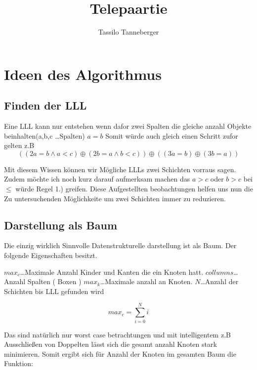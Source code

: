 \documentclass{article}
\begin{document}
\title{Telepaartie}
\author{Tassilo Tanneberger}

\maketitle

\section{Ideen des Algorithmus}

\subsection*{ Finden der LLL}

Eine LLL kann nur entstehen wenn dafor zwei Spalten die gleiche anzahl Objekte beinhalten(a,b,c \dots Spalten) \( a = b\) Somit würde auch gleich einen Schritt zufor gelten z.B 
\begin{equation}
	((2a = b \wedge a < c)  \oplus (2b = a \wedge b < c)) \oplus ((3a = b)  \oplus (3b = a))
\end{equation}

Mit diesem Wissen können wir Mögliche LLLs zwei Schichten vorraus sagen. Zudem möchte ich noch kurz darauf aufmerksam machen das \(a>c\) oder \(b > c\) bei  \( \leq \) würde Regel 1.) greifen. Diese Aufgestellten beobachtungen helfen uns nun die Zu untersuchenden Möglichkeite um zwei Schichten immer zu reduzieren.

\subsection*{ Darstellung als Baum}

Die einzig wirklich Sinnvolle Datenstrukturelle darstellung ist als Baum. Der folgende Eigenschaften besitzt.
\newline

\(max_c\)\dots 				Maximale Anzahl Kinder und Kanten die ein Knoten hatt. \newline
\(collumns\)\dots 			Anzahl Spalten ( Boxen ) \newline
\(max_k\)\dots				Maximale anzahl an Knoten.  \newline
\(N\)\dots    					Anzahl der Schichten bis LLL gefunden wird

\begin{equation}
	max_c =  \sum \limits_{i=0}^N  i
\end{equation}

Das sind natürlich nur worst case betrachtungen und mit intelligentem z.B Ausschließen von Doppelten lässt sich die gesamt anzahl Knoten stark minimieren. Somit ergibt sich für Anzahl der Knoten im gesamten Baum die Funktion: \newline
\end{document}
